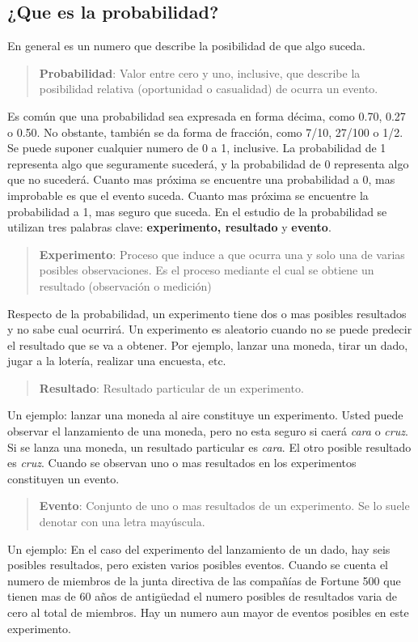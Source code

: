 \documentclass[]{article}
\begin{document}
\subsection{¿Que es la probabilidad?}
En general es un numero que describe la posibilidad de que algo suceda.
\begin{quote}
	\textbf{Probabilidad}: Valor entre cero y uno, inclusive, que describe la posibilidad relativa (oportunidad o casualidad) de ocurra un evento.
\end{quote}
Es común que una probabilidad sea expresada en forma décima, como 0.70, 0.27 o 0.50. No obstante, también se da forma de fracción, como 7/10, 27/100 o 1/2. Se puede suponer cualquier numero de 0 a 1, inclusive. La probabilidad de 1 representa algo que seguramente sucederá, y la probabilidad de 0 representa algo que no sucederá. Cuanto mas próxima se encuentre una probabilidad a 0, mas improbable es que el evento suceda. Cuanto mas próxima se encuentre la probabilidad a 1, mas seguro que suceda. En el estudio de la probabilidad se utilizan tres palabras clave: \textbf{experimento, resultado} y \textbf{evento}.
\begin{quote}
	\textbf{Experimento}: Proceso que induce a que ocurra una y solo una de varias posibles observaciones. Es el proceso mediante el cual se obtiene un resultado (observación o medición)
\end{quote}
Respecto de la probabilidad, un experimento tiene dos o mas posibles resultados y no sabe cual ocurrirá. Un experimento es aleatorio cuando no se puede predecir el resultado que se va a obtener. Por ejemplo, lanzar una moneda, tirar un dado, jugar a la lotería, realizar una encuesta, etc.
\begin{quote}
	\textbf{Resultado}: Resultado particular de un experimento.
\end{quote}
Un ejemplo: lanzar una moneda al aire constituye un experimento. Usted puede observar el lanzamiento de una moneda, pero no esta seguro si caerá \textit{cara} o \textit{cruz}. Si se lanza una moneda, un resultado particular es \textit{cara}. El otro posible resultado es \textit{cruz}. Cuando se observan uno o mas resultados en los experimentos constituyen un evento.
\begin{quote}
	\textbf{Evento}: Conjunto de uno o mas resultados de un experimento. Se lo suele denotar con una letra mayúscula.
\end{quote}
Un ejemplo: En el caso del experimento del lanzamiento de un dado, hay seis posibles resultados, pero existen varios posibles eventos. Cuando se cuenta el numero de miembros de la junta directiva de las compañías de Fortune 500 que tienen mas de 60 años de antigüedad el numero posibles de resultados varia de cero al total de miembros. Hay un numero aun mayor de eventos posibles en este experimento.\linebreak
\end{document}

